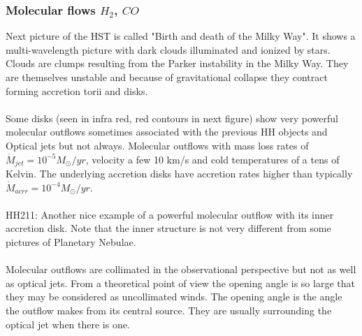 \documentclass[10pt,a4paper]{article}
\begin{document}
\subsubsection{Molecular flows $H_2$, $CO$}
Next picture of the HST is called "Birth and death of the Milky Way". It shows a multi-wavelength picture with dark clouds illuminated and ionized by stars. Clouds are clumps resulting from the Parker instability in the Milky Way. They are themselves unstable and because of gravitational collapse they contract forming accretion torii and disks.\\
\\
Some disks (seen in infra red, red contours in next figure) show very powerful molecular outflows sometimes associated with the previous HH objects and Optical jets but not always. Molecular outflows with mass loss rates of $\dot{M}_{jet}=10^{-5}M_{\odot} /yr$, velocity a few 10 km/s and cold temperatures of a tens of Kelvin. The underlying accretion disks have accretion rates higher than typically $\dot{M}_{acrr}=10^{-4}M_{\odot} /yr$.\\
\\
HH211: Another nice example of a powerful molecular outflow with its inner accretion disk. Note that the inner structure is not very different from some pictures of Planetary Nebulae.\\
\\
Molecular outflows are collimated in the observational perspective but not as well as optical jets. From a theoretical point of view the opening angle is so large that they may be considered as uncollimated winds. The opening angle is the angle the outflow makes from its central source. They are usually surrounding the optical jet when there is one.
\end{document}
